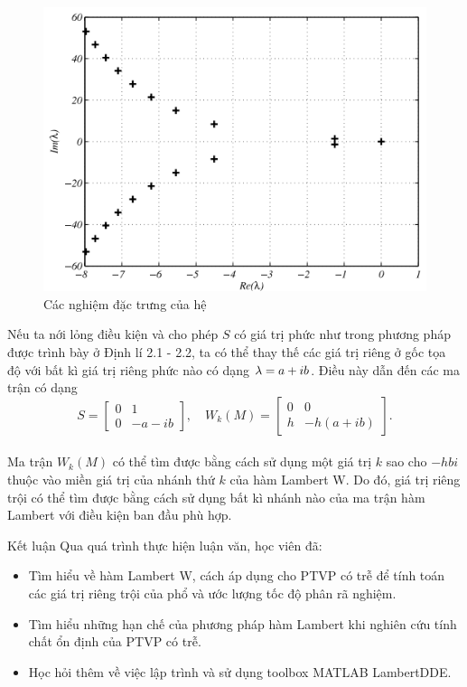 \documentclass[10pt]{beamer}
\begin{document}
	\scriptsize{
	\begin{frame}
		\begin{figure}[h!]
			\centering
			\includegraphics[scale= 0.35]{"../Hinh/Hinh 3"}
			\caption[Các nghiệm đặc trưng của hệ \eqref{eq43}] {Các nghiệm đặc trưng của hệ }
			\label{fig:hinh-3}
		\end{figure}
		Nếu ta nới lỏng điều kiện và cho phép $S$ có giá trị phức như trong phương pháp được trình bày ở Định lí 2.1 - 2.2, ta có thể thay thế các giá trị riêng ở gốc tọa độ với bất kì giá trị riêng phức nào có dạng $\lambda = a + ib$. Điều này dẫn đến các ma trận có dạng
		\begin{equation*}\label{eq45}
			S = \begin{bmatrix}
				0 & 1\\
				0 & - a - ib
			\end{bmatrix}, \quad 
			W_k(M) = \begin{bmatrix}
				0 & 0\\
				h  & -h (a+ib)
			\end{bmatrix}.
		\end{equation*}\\
		Ma trận $W_k(M)$ có thể tìm được bằng cách sử dụng một giá trị $k$ sao cho $-h  bi$ thuộc vào miền giá trị của nhánh thứ $k$ của hàm Lambert W. {\color{blue} Do đó, giá trị riêng trội có thể tìm được bằng cách sử dụng bất kì nhánh nào của ma trận hàm Lambert với điều kiện ban đầu phù hợp.} 
	\end{frame}
}
	
	
	\small{
	\begin{frame}{Kết luận}
		Qua quá trình thực hiện luận văn, học viên đã:
		\begin{itemize}
			\item 
			Tìm hiểu về hàm Lambert W, cách áp dụng cho PTVP có trễ để tính toán các giá trị riêng trội của phổ và ước lượng tốc độ phân rã nghiệm.
			\item
			Tìm hiểu những hạn chế của phương pháp hàm Lambert khi nghiên cứu tính chất ổn định của PTVP có trễ.
			\item
			Học hỏi thêm về việc lập trình và sử dụng toolbox MATLAB LambertDDE.
		\end{itemize}
	\end{frame}
    }
	
\end{document}
